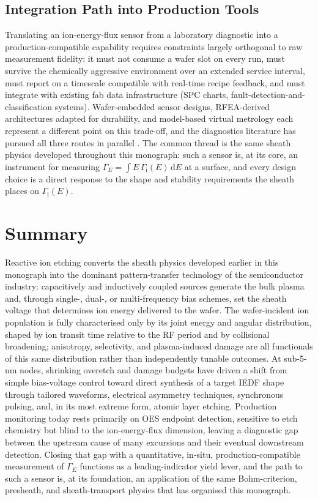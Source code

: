 \subsection{Integration Path into Production Tools}

Translating an ion-energy-flux sensor from a laboratory diagnostic into a production-compatible capability requires constraints largely orthogonal to raw measurement fidelity: it must not consume a wafer slot on every run, must survive the chemically aggressive environment over an extended service interval, must report on a timescale compatible with real-time recipe feedback, and must integrate with existing fab data infrastructure (SPC charts, fault-detection-and-classification systems). Wafer-embedded sensor designs, RFEA-derived architectures adapted for durability, and model-based virtual metrology each represent a different point on this trade-off, and the diagnostics literature has pursued all three routes in parallel \cite{ref0548,ref0553,ref0556}. The common thread is the same sheath physics developed throughout this monograph: such a sensor is, at its core, an instrument for measuring $\Gamma_{E} = \int E\, \Gamma_{\mathrm{i}}(E)\, \mathrm{d}E$ at a surface, and every design choice is a direct response to the shape and stability requirements the sheath places on $\Gamma_{\mathrm{i}}(E)$.

\section{Summary}

Reactive ion etching converts the sheath physics developed earlier in this monograph into the dominant pattern-transfer technology of the semiconductor industry: capacitively and inductively coupled sources generate the bulk plasma and, through single-, dual-, or multi-frequency bias schemes, set the sheath voltage that determines ion energy delivered to the wafer. The wafer-incident ion population is fully characterised only by its joint energy and angular distribution, shaped by ion transit time relative to the RF period and by collisional broadening; anisotropy, selectivity, and plasma-induced damage are all functionals of this same distribution rather than independently tunable outcomes. At sub-5-nm nodes, shrinking overetch and damage budgets have driven a shift from simple bias-voltage control toward direct synthesis of a target IEDF shape through tailored waveforms, electrical asymmetry techniques, synchronous pulsing, and, in its most extreme form, atomic layer etching. Production monitoring today rests primarily on OES endpoint detection, sensitive to etch chemistry but blind to the ion-energy-flux dimension, leaving a diagnostic gap between the upstream cause of many excursions and their eventual downstream detection. Closing that gap with a quantitative, in-situ, production-compatible measurement of $\Gamma_{E}$ functions as a leading-indicator yield lever, and the path to such a sensor is, at its foundation, an application of the same Bohm-criterion, presheath, and sheath-transport physics that has organised this monograph.
